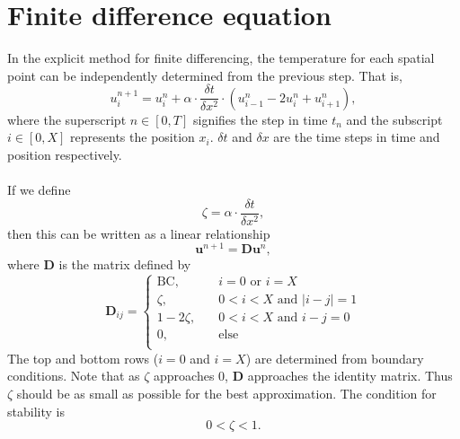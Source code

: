 \documentclass[letterpaper,titlepage,oneside]{report}
\begin{document}
\section*{Finite difference equation}
In the explicit method for finite differencing, the temperature for
each spatial point can be independently determined from the previous
step. That is,
\begin{equation}\label{eq:explicit}
  u_i^{n+1} = u_i^n + \alpha\cdot\frac{\delta t}{\delta x^2}\cdot
  \left(u_{i-1}^n - 2u_i^n + u_{i+1}^n\right),
\end{equation}
where the superscript $n \in [0, T]$ signifies the step in time
$t_n$ and the
subscript $i \in [0, X]$ represents the position
$x_i$. $\delta t$ and $\delta x$
are the time steps in time and position respectively.
\\\\
If we define
\begin{equation*}
  \zeta = \alpha\cdot\frac{\delta t}{\delta x^2},
\end{equation*}
then this can be written as a linear relationship
\begin{equation}\label{eq:explicitlinear}
  \mathbf{u}^{n+1} = \mathbf{D}\mathbf{u}^{n},
\end{equation}
where $\mathbf{D}$ is the matrix defined by
\begin{equation}\label{eq:explicitdmatrix}
  \mathbf{D}_{ij} = 
  \begin{cases}
    \text{BC}, & \quad i=0 \text{ or } i=X \\
    \zeta,     & \quad 0<i<X \text{ and } |i-j|=1 \\
    1-2\zeta,  & \quad 0<i<X \text{ and } i-j=0 \\
    0,         & \quad \text{else} \\
  \end{cases}
\end{equation}
The top and bottom rows ($i=0$ and $i=X$) are determined from
boundary conditions. Note that as $\zeta$ approaches $0$,
$\mathbf{D}$ approaches the identity matrix. Thus $\zeta$ should be
as small as possible for the best approximation. The condition for
stability is
\begin{equation}\label{eq:stability}
  0<\zeta<1.
\end{equation}
\end{document}
